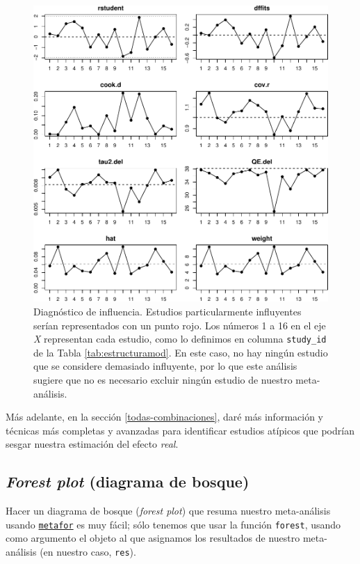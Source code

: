 \documentclass[
  bookmarksnumbered]{article}
\begin{document}
\begin{figure}
\centering
\includegraphics{Meta-analysis_files/figure-latex/infplot-1.pdf}
\caption{\label{fig:infplot}Diagnóstico de influencia. Estudios particularmente influyentes serían representados con un punto rojo. Los números 1 a 16 en el eje \emph{X} representan cada estudio, como lo definimos en columna \texttt{study\_id} de la Tabla \ref{tab:estructuramod}. En este caso, no hay ningún estudio que se considere demasiado influyente, por lo que este análisis sugiere que no es necesario excluir ningún estudio de nuestro meta-análisis.}
\end{figure}

Más adelante, en la sección \ref{todas-combinaciones}, daré más información y técnicas más completas y avanzadas para identificar estudios atípicos que podrían sesgar nuestra estimación del efecto \emph{real}.

\hypertarget{forest-inf}{%
\subsection{\texorpdfstring{\emph{Forest plot} (diagrama de bosque)}{Forest plot (diagrama de bosque)}}\label{forest-inf}}

Hacer un diagrama de bosque (\emph{forest plot}) que resuma nuestro meta-análisis usando \href{https://www.metafor-project.org/doku.php}{\texttt{metafor}} es muy fácil; sólo tenemos que usar la función \texttt{forest}, usando como argumento el objeto al que asignamos los resultados de nuestro meta-análisis (en nuestro caso, \texttt{res}).
\end{document}
